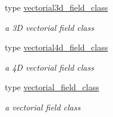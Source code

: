 \begin{DoxyCompactItemize}
type \mbox{\hyperlink{structfieldtypes__mod_1_1vectorial3d__field__class}{vectorial3d\+\_\+field\+\_\+class}}
\begin{DoxyCompactList}\small\item\em a 3D vectorial field class \end{DoxyCompactList}\item 
type \mbox{\hyperlink{structfieldtypes__mod_1_1vectorial4d__field__class}{vectorial4d\+\_\+field\+\_\+class}}
\begin{DoxyCompactList}\small\item\em a 4D vectorial field class \end{DoxyCompactList}\item 
type \mbox{\hyperlink{structfieldtypes__mod_1_1vectorial__field__class}{vectorial\+\_\+field\+\_\+class}}
\begin{DoxyCompactList}\small\item\em a vectorial field class \end{DoxyCompactList}\end{DoxyCompactItemize}
